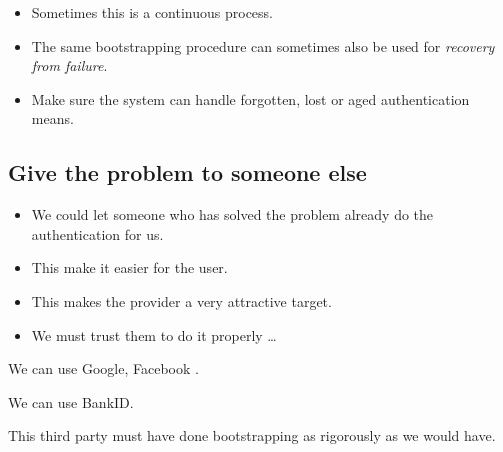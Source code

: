\begin{frame}
  \begin{itemize}
    \item Sometimes this is a continuous process.

    \item The same bootstrapping procedure can sometimes also be used for 
      \emph{recovery from failure}.

    \item Make sure the system can handle forgotten, lost or aged 
      authentication means.
  \end{itemize}
\end{frame}

\subsection{Give the problem to someone else}

\begin{frame}
  \begin{idea}
    \begin{itemize}
      \item We could let someone who has solved the problem already do the 
        authentication for us.
    \end{itemize}
  \end{idea}

  \pause

  \begin{remark}
    \begin{itemize}
      \item This make it easier for the user.

      \item This makes the provider a very attractive target.

      \item We must trust them to do it properly \dots
    \end{itemize}
  \end{remark}
\end{frame}

\begin{frame}
  \begin{example}
    We can use Google, Facebook \etc.
  \end{example}

  \begin{example}
    We can use \eg BankID.
  \end{example}

  \begin{remark}
    This third party must have done bootstrapping as rigorously as we would 
    have.
  \end{remark}
\end{frame}




\begin{frame}[allowframebreaks]
	\small
  \printbibliography
\end{frame}

